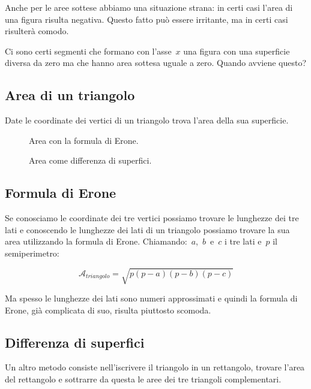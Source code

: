 Anche per le aree sottese abbiamo una situazione strana: in certi casi 
l'area di una figura risulta negativa. Questo fatto può essere irritante, 
ma in certi casi risulterà comodo.

Ci sono certi segmenti che formano con l'asse~$x$ una figura con una 
superficie diversa da zero ma che hanno area sottesa uguale a zero.
Quando avviene questo?

\newpage

\subsection{Area di un triangolo}

Date le coordinate dei vertici di un triangolo trova l'area della sua 
superficie.

\begin{inaccessibleblock}
 \begin{figure}[h]
 \centering
 \begin{minipage}[t]{.45\textwidth}
  \centering \triangoloerone
  \caption{Area con la formula di Erone.}\label{fig:triangoloerone}
 \end{minipage}\hfil
 \begin{minipage}[t]{.45\textwidth}
  \centering \triangolodifferenza
  \caption{Area come differenza di superfici.}\label{fig:triangolodifferenza}
 \end{minipage}\hfil
\end{figure}
\end{inaccessibleblock}

\subsection*{Formula di Erone}
Se conosciamo le coordinate dei tre vertici possiamo trovare le lunghezze dei 
tre lati e conoscendo le lunghezze dei lati di un triangolo possiamo trovare
la sua area utilizzando la formula di Erone. Chiamando:~$a$,~$b$~e~$c$ i tre 
lati e~$p$ il semiperimetro:

\[\mathcal{A}_{triangolo} = \sqrt{p(p-a)(p-b)(p-c)}\]

Ma spesso le lunghezze dei lati sono numeri approssimati e quindi la formula
di Erone, già complicata di suo, risulta piuttosto scomoda.

\subsection*{Differenza di superfici}
Un altro metodo consiste nell'iscrivere il triangolo in un rettangolo, 
trovare l'area del rettangolo e sottrarre da questa le aree dei tre triangoli 
complementari.

